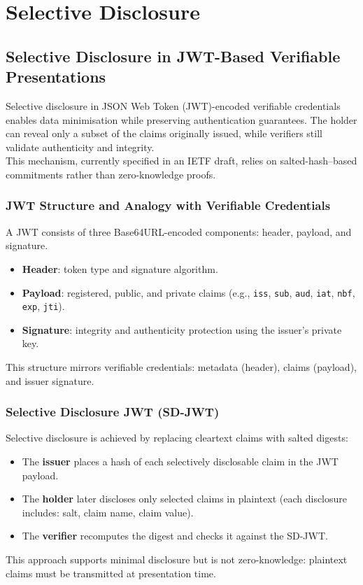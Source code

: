 \section{Selective Disclosure}

\subsection{Selective Disclosure in JWT-Based Verifiable Presentations}

Selective disclosure in JSON Web Token (JWT)-encoded verifiable credentials enables data minimisation while preserving authentication guarantees. The holder can reveal only a subset of the claims originally issued, while verifiers still validate authenticity and integrity. \\
This mechanism, currently specified in an IETF draft, relies on salted-hash–based commitments rather than zero-knowledge proofs.

\subsubsection*{JWT Structure and Analogy with Verifiable Credentials}
A JWT consists of three Base64URL-encoded components: header, payload, and signature.  
\begin{itemize}
    \item \textbf{Header}: token type and signature algorithm.
    \item \textbf{Payload}: registered, public, and private claims (e.g., \texttt{iss}, \texttt{sub}, \texttt{aud}, \texttt{iat}, \texttt{nbf}, \texttt{exp}, \texttt{jti}).
    \item \textbf{Signature}: integrity and authenticity protection using the issuer's private key.
\end{itemize}
This structure mirrors verifiable credentials: metadata (header), claims (payload), and issuer signature.

\subsubsection*{Selective Disclosure JWT (SD-JWT)}
Selective disclosure is achieved by replacing cleartext claims with salted digests:
\begin{itemize}
    \item The \textbf{issuer} places a hash of each selectively disclosable claim in the JWT payload.
    \item The \textbf{holder} later discloses only selected claims in plaintext (each disclosure includes: salt, claim name, claim value).
    \item The \textbf{verifier} recomputes the digest and checks it against the SD-JWT.
\end{itemize}
This approach supports minimal disclosure but is not zero-knowledge: plaintext claims must be transmitted at presentation time.

